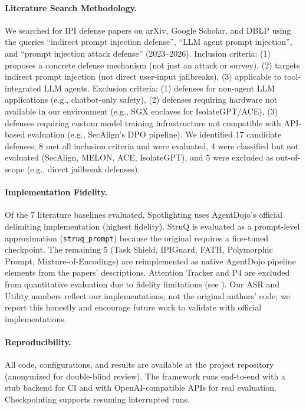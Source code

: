 \paragraph{Literature Search Methodology.}
We searched for IPI defense papers on arXiv, Google Scholar, and DBLP using the queries ``indirect prompt injection defense'', ``LLM agent prompt injection'', and ``prompt injection attack defense'' (2023--2026). Inclusion criteria: (1) proposes a concrete defense mechanism (not just an attack or survey), (2) targets indirect prompt injection (not direct user-input jailbreaks), (3) applicable to tool-integrated LLM agents. Exclusion criteria: (1) defenses for non-agent LLM applications (e.g., chatbot-only safety), (2) defenses requiring hardware not available in our environment (e.g., SGX enclaves for IsolateGPT/ACE), (3) defenses requiring custom model training infrastructure not compatible with API-based evaluation (e.g., SecAlign's DPO pipeline). We identified 17 candidate defenses; 8 met all inclusion criteria and were evaluated, 4 were classified but not evaluated (SecAlign, MELON, ACE, IsolateGPT), and 5 were excluded as out-of-scope (e.g., direct jailbreak defenses).

\paragraph{Implementation Fidelity.}
Of the 7 literature baselines evaluated, Spotlighting uses AgentDojo's official delimiting implementation (highest fidelity). StruQ is evaluated as a prompt-level approximation (\texttt{struq\_prompt}) because the original requires a fine-tuned checkpoint. The remaining 5 (Task Shield, IPIGuard, FATH, Polymorphic Prompt, Mixture-of-Encodings) are reimplemented as native AgentDojo pipeline elements from the papers' descriptions. Attention Tracker and P4 are excluded from quantitative evaluation due to fidelity limitations (see ). Our ASR and Utility numbers reflect our implementations, not the original authors' code; we report this honestly and encourage future work to validate with official implementations.

\paragraph{Reproducibility.}
All code, configurations, and results are available at the project repository (anonymized for double-blind review). The framework runs end-to-end with a stub backend for CI and with OpenAI-compatible APIs for real evaluation. Checkpointing supports resuming interrupted runs.

